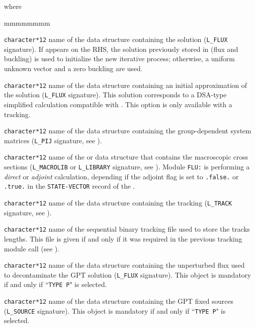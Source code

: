 \noindent where
\begin{ListeDeDescription}{mmmmmmmm}

\item[\dusa{FLUNAM}] {\tt character*12} name of the  data structure
containing the solution ({\tt L\_FLUX} signature). If  appears on
the RHS, the solution previously stored in  (flux and buckling) is used to initialize
the new iterative process; otherwise, a uniform unknown vector and a zero buckling
are used.

\item[\dusa{FLUDSA}] {\tt character*12} name of the  data structure
containing an initial approximation of the solution ({\tt L\_FLUX} signature). This solution
corresponds to a DSA-type simplified
calculation compatible with . This option is only available with a  tracking.

\item[\dusa{PIJNAM}] {\tt character*12} name of the  data
structure containing the group-dependent system
matrices ({\tt L\_PIJ} signature, see ).

\item[\dusa{LIBNAM}] {\tt character*12} name of the  or  data structure that contains the
macroscopic cross sections ({\tt L\_MACROLIB} or {\tt L\_LIBRARY} signature, see ).
Module {\tt FLU:} is performing a {\sl direct} or {\sl adjoint} calculation, depending if the adjoint flag
is set to {\tt .false.} or {\tt .true.} in the {\tt STATE-VECTOR} record of the .

\item[\dusa{TRKNAM}] {\tt character*12} name of the  data
structure containing the tracking ({\tt L\_TRACK} signature, see ).

\item[\dusa{TRKFIL}] {\tt character*12} name of the sequential binary tracking
file used to store the tracks lengths. This file is given if and only if it was
required in the previous tracking module call (see ).

\item[\dusa{TRKFLP}] {\tt character*12} name of the  data structure containing the
unperturbed flux used to decontaminate the GPT solution ({\tt L\_FLUX} signature). This object is
mandatory if and only if ``{\tt TYPE P}" is selected.

\item[\dusa{TRKGPT}] {\tt character*12} name of the  data structure
containing the GPT fixed sources ({\tt L\_SOURCE} signature). This object is
mandatory if and only if ``{\tt TYPE P}" is selected.


\end{ListeDeDescription}
